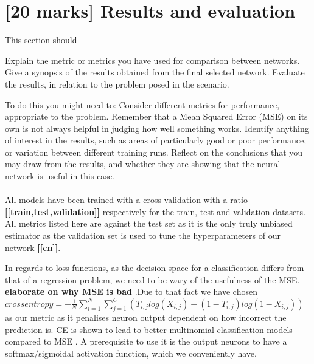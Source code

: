 \documentclass[11pt,a4paper]{article}
\begin{document}




\section{[20 marks] Results and evaluation}
\label{sec:results}
This section should
\begin{outline}
  \1 Explain the metric or metrics you have used for comparison between networks.
  \1 Give a synopsis of the results obtained from the final selected network.
  \1 Evaluate the results, in relation to the problem posed in the scenario. 
\end{outline}
\begin{outline}
To do this you might need to:
  \1 Consider different metrics for performance, appropriate to the problem. Remember that a Mean Squared Error (MSE) on its own is not always helpful in judging how well something works.
  \1 Identify anything of interest in the results, such as areas of particularly good or poor performance, or variation between different training runs.
  \1 Reflect on the conclusions that you may draw from the results, and whether they are showing that the neural network is useful in this case.
\end{outline}

\paragraph{}
All models have been trained with a cross-validation with a ratio \textbf{[[train,test,validation]]} respectively for the train, test and validation datasets. All metrics listed here are against the test set as it is the only truly unbiased estimator as the validation set is used to tune the hyperparameters of our network \textbf{[[cn]]}.

In regards to loss functions, as the decision space for a classification differs from that of a regression problem, we need to be wary of the usefulness of the MSE. \textbf{elaborate on why MSE is bad} .Due to that fact we have chosen \(crossentropy = -\frac{1}{N}\sum_{i=1}^N\sum_{j=1}^C(T_{i,j}log(X_{i,j})+(1 - T_{i,j})log(1-X_{i,j}))\) as our metric as it penalises neuron output dependent on how incorrect the prediction is. CE is shown to lead to better multinomial classification models compared to MSE \autocite{Golik2013CrossentropyVS}. A prerequisite to use it is the output neurons to have a softmax/sigmoidal activation function, which we conveniently have.
\end{document}
